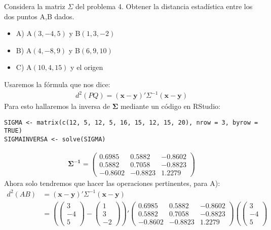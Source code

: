 \begin{problem}{5}
Considera la matriz $\Sigma$ del problema 4. Obtener la distancia estadística entre los dos puntos A,B dados. 
\begin{itemize}
\item A) A$(3,-4,5)$ y B$(1,3,-2)$
\item B) A$(4,-8,9)$ y B$(6,9,10)$
\item C) A$(10,4,15)$ y el origen
\end{itemize}
\end{problem}
\begin{sol}
Usaremos la fórmula que nos dice:
\begin{align*}
d^2(PQ) = (\mathbf{x}-\mathbf{y})' \Sigma^{-1} (\mathbf{x}-\mathbf{y})
\end{align*}
Para esto hallaremos la inversa de $\mathbf{\Sigma}$ mediante un código en RStudio:
\begin{verbatim}
SIGMA <- matrix(c(12, 5, 12, 5, 16, 15, 12, 15, 20), nrow = 3, byrow = TRUE)
SIGMAINVERSA <- solve(SIGMA)
\end{verbatim}
\begin{align*}
\mathbf{\Sigma^{-1}} =
\begin{pmatrix}
0.6985 &  0.5882 & -0.8602 \\
0.5882 & 0.7058 & -0.8823  \\
-0.8602 & -0.8823 & 1.2279
\end{pmatrix}
\end{align*}
Ahora solo tendremos que hacer las operaciones pertinentes, para A):
\begin{align*}
d^2(AB) &= (\mathbf{x}-\mathbf{y})' \Sigma^{-1} (\mathbf{x}-\mathbf{y})\\
&= 
\left( \begin{pmatrix}
3 \\ -4 \\ 5
\end{pmatrix}- 
\begin{pmatrix}
1\\3\\-2
\end{pmatrix} \right)'
\begin{pmatrix}
0.6985 &  0.5882 & -0.8602 \\
0.5882 & 0.7058 & -0.8823  \\
-0.8602 & -0.8823 & 1.2279
\end{pmatrix}
\left( \begin{pmatrix}
3 \\ -4 \\ 5

\end{pmatrix}
\end{align*}
\end{sol}
